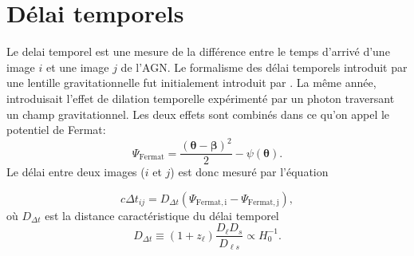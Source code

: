 \documentclass[times,10pt,twocolumn]{article}
\begin{document}
\section{Délai temporels}
Le delai temporel est une mesure de la différence entre le temps d'arrivé d'une image $i$ 
et une image $j$ de l'AGN. Le formalisme des délai temporels introduit par une 
lentille gravitationnelle fut initialement introduit par \cite{Refsdal1964}. La même 
année, \cite{Shapiro1964} introduisait l'effet de dilation temporelle expérimenté par 
un photon traversant un champ gravitationnel. Les deux effets sont combinés dans ce 
qu'on appel le potentiel de Fermat:
\begin{equation}\label{eq:PotentielFermat} 
        \Psi_{\mathrm{Fermat}} = \frac{(\boldsymbol{\theta} - \boldsymbol{\beta})^{2}}{2}
        - \psi(\boldsymbol{\theta}).
\end{equation} 
Le délai entre deux images ($i$ et $j$) est donc mesuré par l'équation




\begin{equation}\label{eq:TimeDelay} 
        c \Delta t_{ij} = D_{\Delta t} \left( \Psi_{\mathrm{Fermat, i}} - 
        \Psi_{\mathrm{Fermat, j}} \right),
\end{equation} 
où $D_{\Delta t}$ est la distance caractéristique du délai temporel
\begin{equation}\label{eq:Ddt} 
        D_{\Delta t} \equiv (1 + z_{\ell}) \frac{D_\ell D_s}{D_{\ell s}} \propto H_0^{-1}.
\end{equation} 
\end{document}
